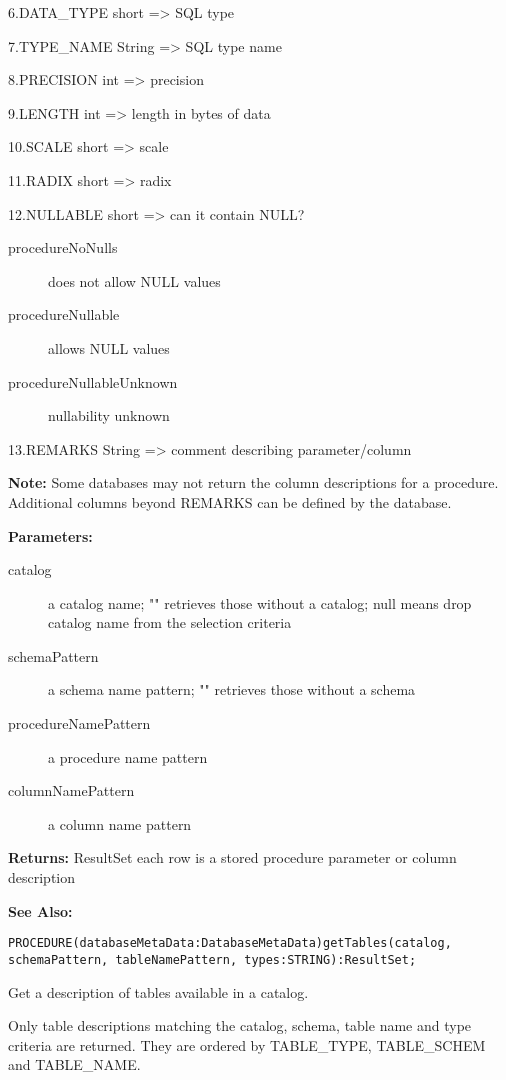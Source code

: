 6.DATA\_TYPE short => SQL type

7.TYPE\_NAME String => SQL type name

8.PRECISION int => precision

9.LENGTH int => length in bytes of data

10.SCALE short => scale

11.RADIX short => radix

12.NULLABLE short => can it contain NULL? 
\begin{description}
\item[procedureNoNulls] does not allow NULL values 
\item[procedureNullable] allows NULL values 
\item[procedureNullableUnknown] nullability unknown 
\end{description}

13.REMARKS String => comment describing parameter/column 


{\bf Note: } Some databases may not return the column descriptions for a procedure. Additional columns beyond REMARKS can be defined by the database. 

{\bf Parameters: }
\begin{description}
\item[catalog] a catalog name; "" retrieves those without a catalog; null means drop catalog name from the selection criteria 
\item[schemaPattern] a schema name pattern; "" retrieves those without a schema 
\item[procedureNamePattern] a procedure name pattern 
\item[columnNamePattern] a column name pattern 
\end{description}

{\bf Returns: } 
ResultSet each row is a stored procedure parameter or column description 

{\bf See Also:} 




\verb'PROCEDURE(databaseMetaData:DatabaseMetaData)getTables(catalog, schemaPattern, tableNamePattern, types:STRING):ResultSet;'




Get a description of tables available in a catalog. 

Only table descriptions matching the catalog, schema, table name and type criteria are returned. They are ordered by TABLE\_TYPE, TABLE\_SCHEM and TABLE\_NAME. 

